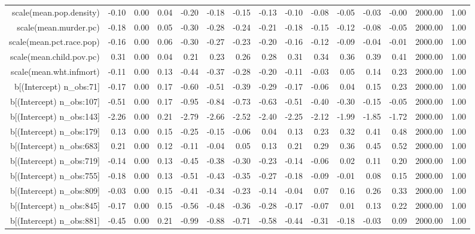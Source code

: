 \begin{table}[ht]
\begin{tabular}{rrrrrrrrrrrrrrr}
  scale(mean.pop.density) & -0.10 & 0.00 & 0.04 & -0.20 & -0.18 & -0.15 & -0.13 & -0.10 & -0.08 & -0.05 & -0.03 & -0.00 & 2000.00 & 1.00 \\ 
  scale(mean.murder.pc) & -0.18 & 0.00 & 0.05 & -0.30 & -0.28 & -0.24 & -0.21 & -0.18 & -0.15 & -0.12 & -0.08 & -0.05 & 2000.00 & 1.00 \\ 
  scale(mean.pct.race.pop) & -0.16 & 0.00 & 0.06 & -0.30 & -0.27 & -0.23 & -0.20 & -0.16 & -0.12 & -0.09 & -0.04 & -0.01 & 2000.00 & 1.00 \\ 
  scale(mean.child.pov.pc) & 0.31 & 0.00 & 0.04 & 0.21 & 0.23 & 0.26 & 0.28 & 0.31 & 0.34 & 0.36 & 0.39 & 0.41 & 2000.00 & 1.00 \\ 
  scale(mean.wht.infmort) & -0.11 & 0.00 & 0.13 & -0.44 & -0.37 & -0.28 & -0.20 & -0.11 & -0.03 & 0.05 & 0.14 & 0.23 & 2000.00 & 1.00 \\ 
  b[(Intercept) n\_obs:71] & -0.17 & 0.00 & 0.17 & -0.60 & -0.51 & -0.39 & -0.29 & -0.17 & -0.06 & 0.04 & 0.15 & 0.23 & 2000.00 & 1.00 \\ 
  b[(Intercept) n\_obs:107] & -0.51 & 0.00 & 0.17 & -0.95 & -0.84 & -0.73 & -0.63 & -0.51 & -0.40 & -0.30 & -0.15 & -0.05 & 2000.00 & 1.00 \\ 
  b[(Intercept) n\_obs:143] & -2.26 & 0.00 & 0.21 & -2.79 & -2.66 & -2.52 & -2.40 & -2.25 & -2.12 & -1.99 & -1.85 & -1.72 & 2000.00 & 1.00 \\ 
  b[(Intercept) n\_obs:179] & 0.13 & 0.00 & 0.15 & -0.25 & -0.15 & -0.06 & 0.04 & 0.13 & 0.23 & 0.32 & 0.41 & 0.48 & 2000.00 & 1.00 \\ 
  b[(Intercept) n\_obs:683] & 0.21 & 0.00 & 0.12 & -0.11 & -0.04 & 0.05 & 0.13 & 0.21 & 0.29 & 0.36 & 0.45 & 0.52 & 2000.00 & 1.00 \\ 
  b[(Intercept) n\_obs:719] & -0.14 & 0.00 & 0.13 & -0.45 & -0.38 & -0.30 & -0.23 & -0.14 & -0.06 & 0.02 & 0.11 & 0.20 & 2000.00 & 1.00 \\ 
  b[(Intercept) n\_obs:755] & -0.18 & 0.00 & 0.13 & -0.51 & -0.43 & -0.35 & -0.27 & -0.18 & -0.09 & -0.01 & 0.08 & 0.15 & 2000.00 & 1.00 \\ 
  b[(Intercept) n\_obs:809] & -0.03 & 0.00 & 0.15 & -0.41 & -0.34 & -0.23 & -0.14 & -0.04 & 0.07 & 0.16 & 0.26 & 0.33 & 2000.00 & 1.00 \\ 
  b[(Intercept) n\_obs:845] & -0.17 & 0.00 & 0.15 & -0.56 & -0.48 & -0.36 & -0.28 & -0.17 & -0.07 & 0.01 & 0.13 & 0.22 & 2000.00 & 1.00 \\ 
  b[(Intercept) n\_obs:881] & -0.45 & 0.00 & 0.21 & -0.99 & -0.88 & -0.71 & -0.58 & -0.44 & -0.31 & -0.18 & -0.03 & 0.09 & 2000.00 & 1.00 \\ 

\end{tabular}
\end{table}
